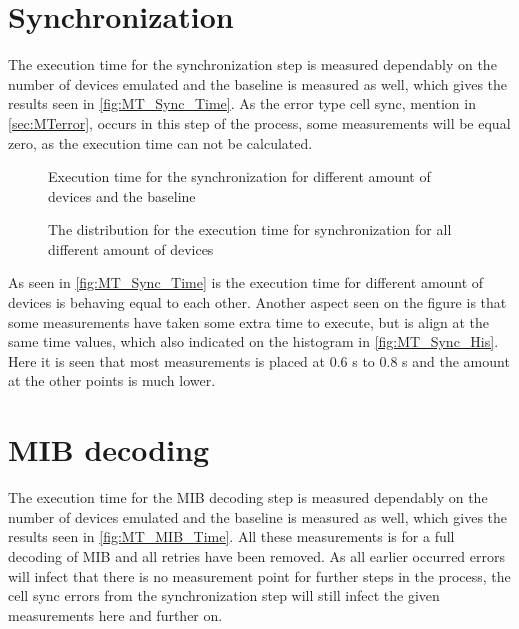 \section{Synchronization}
The execution time for the synchronization step is measured dependably on the number of devices emulated and the baseline is measured as well, which gives the results seen in \autoref{fig:MT_Sync_Time}. As the error type cell sync, mention in \autoref{sec:MTerror}, occurs in this step of the process, some measurements will be equal zero, as the execution time can not be calculated.

\captionsetup{belowskip=0em}
\begin{minipage}{0.48\textwidth}
\begin{figure}[H]
\centering
\resizebox{0.9\textwidth}{!}{
}
\caption{Execution time for the synchronization for different amount of devices and the baseline}
\label{fig:MT_Sync_Time}
\end{figure}
\end{minipage}%
\hfill
\begin{minipage}{0.48\textwidth}
\begin{figure}[H]
\centering
\resizebox{0.9\textwidth}{!}{
}
\caption{The distribution for the execution time for synchronization for all different amount of devices}
\label{fig:MT_Sync_His}
\end{figure}
\end{minipage}
\captionsetup{belowskip=-1.5em}

As seen in \autoref{fig:MT_Sync_Time} is the execution time for different amount of devices is behaving equal to each other. Another aspect seen on the figure is that some measurements have taken some extra time to execute, but is align at the same time values, which also indicated on the histogram in \autoref{fig:MT_Sync_His}. Here it is seen that most measurements is placed at 0.6 s to 0.8 s and the amount at the other points is much lower.



\section{MIB decoding}
The execution time for the MIB decoding step is measured dependably on the number of devices emulated and the baseline is measured as well, which gives the results seen in \autoref{fig:MT_MIB_Time}. All these measurements is for a full decoding of MIB and all retries have been removed.
As all earlier occurred errors will infect that there is no measurement point for further steps in the process, the cell sync errors from the synchronization step will still infect the given measurements here and further on. 

